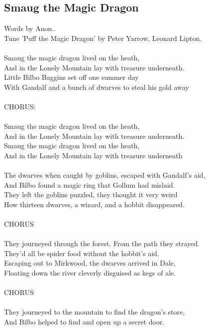 \begin{multicols}{2}
\section{Smaug the Magic Dragon}
Words by Anon..
\\
Tune ’Puff the Magic Dragon’ by Peter Yarrow, Leonard Lipton.
\\
\\
Smaug the magic dragon lived on the heath,
\\
And in the Lonely Mountain lay with treasure underneath.
\\
Little Bilbo Baggins set off one summer day
\\
With Gandalf and a bunch of dwarves to steal his gold away
\\
\\
CHORUS:
\\
\\
Smaug the magic dragon lived on the heath,
\\
And in the Lonely Mountain lay with treasure underneath.
\\
Smaug the magic dragon lived on the heath,
\\
And in the Lonely Mountain lay with treasure underneath
\\
\\
The dwarves when caught by goblins, escaped with Gandalf’s aid,
\\
And Bilbo found a magic ring that Gollum had mislaid.
\\
They left the goblins puzzled, they thought it very weird
\\
How thirteen dwarves, a wizard, and a hobbit disappeared.
\\
\\
CHORUS
\\
\\
They journeyed through the forest. From the path they strayed.
\\
They’d all be spider food without the hobbit’s aid.
\\
Escaping out to Mirkwood, the dwarves arrived in Dale,
\\
Floating down the river cleverly disguised as kegs of ale.
\\
\\
CHORUS
\\
\\
They journeyed to the mountain to find the dragon’s store,
\\
And Bilbo helped to find and open up a secret door.

\end{multicols}
